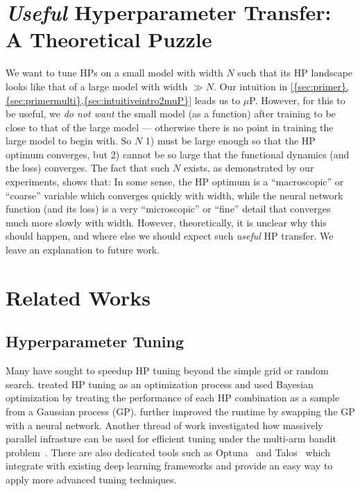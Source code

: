 \documentclass{article}
\theoremstyle{definition}
\begin{document}
\section{\emph{Useful} Hyperparameter Transfer: A Theoretical Puzzle}

We want to tune HPs on a small model with width $N$ such that its HP landscape looks like that of a large model with width $\gg N$. 
Our intuition in \cref{{sec:primer},{sec:primermulti},{sec:intuitiveintro2muP}} leads us to $\mu$P.
However, for this to be useful, we \emph{do not want} the small model (as a function) after training to be close to that of the large model --- otherwise there is no point in training the large model to begin with. So $N$ 1) must be large enough so that the HP optimum converges, but 2) cannot be so large that the functional dynamics (and the loss) converges. 
The fact that such $N$ exists, as demonstrated by our experiments, shows that:
In some sense, the HP optimum is a ``macroscopic'' or ``coarse'' variable which converges quickly with width, while the neural network function (and its loss) is a very ``microscopic'' or ``fine'' detail that converges much more slowly with width.
However, theoretically, it is unclear why this should happen, and where else we should expect such \emph{useful} HP transfer.
We leave an explanation to future work.

\section{Related Works}

\label{sec:relatedworks}

\subsection{Hyperparameter Tuning}
\label{sec:relatedworks_hyptune_appendix}

Many have sought to speedup HP tuning beyond the simple grid or random search.
\citet{snoek2012practical} treated HP tuning as an optimization process and used Bayesian optimization by treating the performance of each HP combination as a sample from a Gaussian process (GP).
\citet{snoek2015scalable} further improved the runtime by swapping the GP with a neural network.
Another thread of work investigated how massively parallel infrasture can be used for efficient tuning under the multi-arm bandit problem~\cite{jamieson2015nonstochastic, li2020massively}.
There are also dedicated tools such as Optuna~\cite{akiba2019optuna} and Talos~\cite{talos} which integrate with existing deep learning frameworks and provide an easy way to apply more advanced tuning techniques.
\end{document}
